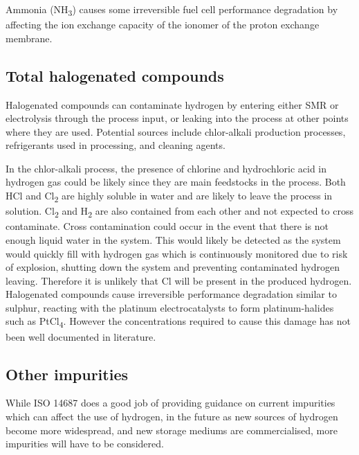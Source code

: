 Ammonia (NH\textsubscript{3}) causes some irreversible fuel cell performance degradation by affecting the ion exchange capacity of the ionomer of the proton exchange membrane. \cite{InternationalStandardISO14687-2:20122012}

\subsection*{Total halogenated compounds} 
Halogenated compounds can contaminate hydrogen by entering either SMR or electrolysis through the process input, or leaking into the process at other points where they are used. Potential sources include chlor-alkali production processes, refrigerants used in processing, and cleaning agents. \cite{Bacquart2018}

In the chlor-alkali process, the presence of chlorine and hydrochloric acid in hydrogen gas could be likely since they are main feedstocks in the process. Both HCl and Cl\textsubscript{2} are highly soluble in water and are likely to leave the process in solution. Cl\textsubscript{2} and H\textsubscript{2} are also contained from each other and not expected to cross contaminate. Cross contamination could occur in the event that there is not enough liquid water in the system. This would likely be detected as the system would quickly fill with hydrogen gas which is continuously monitored due to risk of explosion, shutting down the system and preventing contaminated hydrogen leaving. Therefore it is unlikely that Cl will be present in the produced hydrogen. 
Halogenated compounds cause irreversible performance degradation similar to sulphur, reacting with the platinum electrocatalysts to form platinum-halides such as PtCl\textsubscript{4}. \cite{Dona2009} However the concentrations required to cause this damage has not been well documented in literature.

\subsection*{Other impurities}
While ISO 14687 does a good job of providing guidance on current impurities which can affect the use of hydrogen, in the future as new sources of hydrogen become more widespread, and new storage mediums are commercialised, more impurities will have to be considered. 

